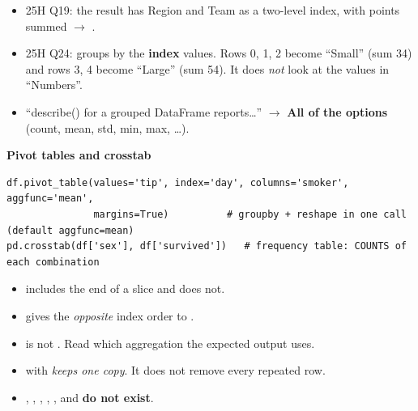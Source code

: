 \begin{exam}
\begin{itemize}
  \item 25H Q19: the result has Region and Team as a two-level index, with points summed $\to$ .
  \item 25H Q24:  groups by the \textbf{index} values. Rows 0, 1, 2 become ``Small'' (sum 34) and rows 3, 4 become ``Large'' (sum 54). It does \emph{not} look at the values in ``Numbers''.
  \item ``describe() for a grouped DataFrame reports\dots'' $\to$ \textbf{All of the options} (count, mean, std, min, max, \dots).
\end{itemize}
\end{exam}

\textbf{Pivot tables and crosstab}
\begin{codebox}
\begin{Verbatim}
df.pivot_table(values='tip', index='day', columns='smoker', aggfunc='mean',
               margins=True)          # groupby + reshape in one call (default aggfunc=mean)
pd.crosstab(df['sex'], df['survived'])   # frequency table: COUNTS of each combination
\end{Verbatim}
\end{codebox}

\begin{traps}
\begin{itemize}
  \item {} includes the end of a slice and  does not.
  \item {} gives the \emph{opposite} index order to .
  \item {} is not . Read which aggregation the expected output uses.
  \item {} with  \emph{keeps one copy}. It does not remove every repeated row.
  \item {}, , , , ,  and  \textbf{do not exist}.
\end{itemize}
\end{traps}
